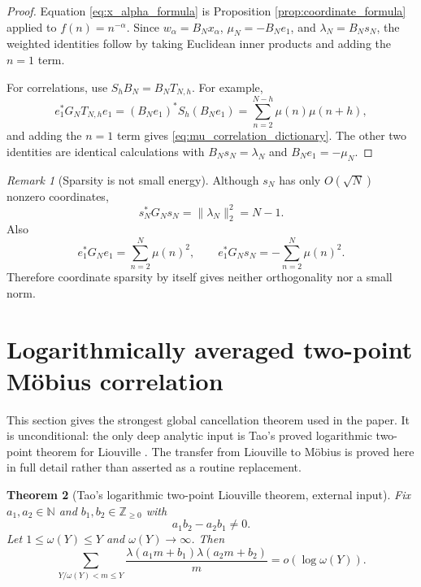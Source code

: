 \documentclass[11pt]{amsart}
\numberwithin{equation}{section}
\theoremstyle{plain}
\newtheorem{theorem}{Theorem}[section]
\theoremstyle{definition}
\theoremstyle{remark}
\newtheorem{remark}[theorem]{Remark}
\newcommand{\N}{\mathbb N}
\newcommand{\Z}{\mathbb Z}
\newcommand{\mob}{\mu}
\newcommand{\liou}{\lambda}
\begin{document}
\begin{proof}
Equation \eqref{eq:x_alpha_formula} is Proposition \ref{prop:coordinate_formula} applied to $f(n)=n^{-\alpha}$.  Since $w_\alpha=B_Nx_\alpha$, $\mob_N=-B_Ne_1$, and $\liou_N=B_Ns_N$, the weighted identities follow by taking Euclidean inner products and adding the $n=1$ term.

For correlations, use $S_hB_N=B_NT_{N,h}$.  For example,
\begin{equation}
e_1^*G_NT_{N,h}e_1
=(B_Ne_1)^*S_h(B_Ne_1)
=\sum_{n=2}^{N-h}\mob(n)\mob(n+h),
\label{eq:mu_correlation_proof}
\end{equation}
and adding the $n=1$ term gives \eqref{eq:mu_correlation_dictionary}.  The other two identities are identical calculations with $B_Ns_N=\liou_N$ and $B_Ne_1=-\mob_N$.
\end{proof}

\begin{remark}[Sparsity is not small energy]
\label{rem:sparsity_not_energy}
Although $s_N$ has only $O(\sqrt N)$ nonzero coordinates,
\begin{equation}
s_N^*G_Ns_N=\|\liou_N\|_2^2=N-1.
\label{eq:sN_energy}
\end{equation}
Also
\begin{equation}
e_1^*G_Ne_1=\sum_{n=2}^{N}\mob(n)^2,
\qquad
e_1^*G_Ns_N=-\sum_{n=2}^{N}\mob(n)^2.
\label{eq:mu_lambda_G_overlap}
\end{equation}
Therefore coordinate sparsity by itself gives neither orthogonality nor a small norm.
\end{remark}

\section{Logarithmically averaged two-point Möbius correlation}
\label{sec:log_mobius}

This section gives the strongest global cancellation theorem used in the paper.  It is unconditional: the only deep analytic input is Tao's proved logarithmic two-point theorem for Liouville \cite{Tao2016}.  The transfer from Liouville to Möbius is proved here in full detail rather than asserted as a routine replacement.

\begin{theorem}[Tao's logarithmic two-point Liouville theorem, external input]
\label{thm:Tao_external}
Fix $a_1,a_2\in\N$ and $b_1,b_2\in\Z_{\ge0}$ with
\begin{equation}
a_1b_2-a_2b_1\ne0.
\label{eq:Tao_nondegeneracy}
\end{equation}
Let $1\le\omega(Y)\le Y$ and $\omega(Y)\to\infty$.  Then
\begin{equation}
\sum_{Y/\omega(Y)<m\le Y}
\frac{\liou(a_1m+b_1)\liou(a_2m+b_2)}{m}
=o(\log\omega(Y)).
\label{eq:Tao_liouville}
\end{equation}
\end{theorem}
\end{document}
